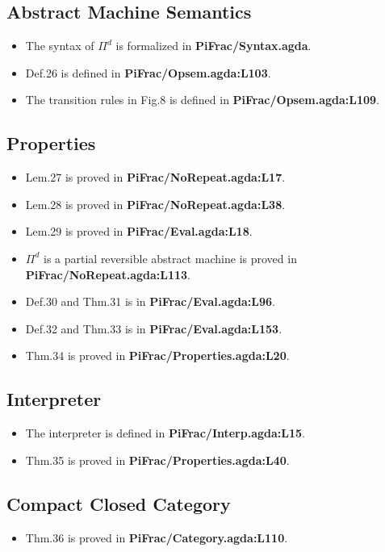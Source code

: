 \documentclass{article}
\begin{document}
\subsection{Abstract Machine Semantics}
\begin{itemize}
\item The syntax of $\Pi^d$ is formalized in \textbf{PiFrac/Syntax.agda}.
\item Def.26 is defined in \textbf{PiFrac/Opsem.agda:L103}.
\item The transition rules in Fig.8 is defined in \textbf{PiFrac/Opsem.agda:L109}.
\end{itemize}

\subsection{Properties}
\begin{itemize}
\item Lem.27 is proved in \textbf{PiFrac/NoRepeat.agda:L17}.
\item Lem.28 is proved in \textbf{PiFrac/NoRepeat.agda:L38}.
\item Lem.29 is proved in \textbf{PiFrac/Eval.agda:L18}.
\item $\Pi^d$ is a partial reversible abstract machine is proved in \textbf{PiFrac/NoRepeat.agda:L113}.
\item Def.30 and Thm.31 is in \textbf{PiFrac/Eval.agda:L96}.
\item Def.32 and Thm.33 is in \textbf{PiFrac/Eval.agda:L153}.
\item Thm.34 is proved in \textbf{PiFrac/Properties.agda:L20}.
\end{itemize}

\subsection{Interpreter}
\begin{itemize}
\item The interpreter is defined in \textbf{PiFrac/Interp.agda:L15}.
\item Thm.35 is proved in \textbf{PiFrac/Properties.agda:L40}.
\end{itemize}

\subsection{Compact Closed Category}
\begin{itemize}
\item Thm.36 is proved in \textbf{PiFrac/Category.agda:L110}.
\end{itemize}
\end{document}
